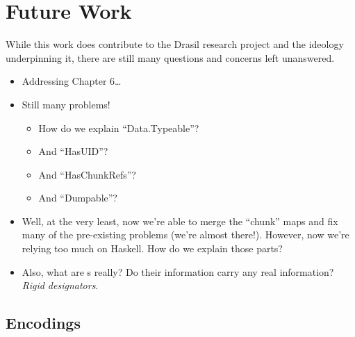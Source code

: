 \chapter{Future Work}
\label{chap:futureWork}


While this work does contribute to the Drasil research project and the ideology
underpinning it, there are still many questions and concerns left unanswered.

\begin{itemize}

      \item Addressing Chapter 6\ldots{}

      \item Still many problems!
            \begin{itemize}

                  \item How do we explain ``Data.Typeable''?

                  \item And ``HasUID''?

                  \item And ``HasChunkRefs''?

                  \item And ``Dumpable''?

            \end{itemize}

      \item Well, at the very least, now we're able to merge the ``chunk'' maps
            and fix many of the pre-existing problems (we're almost there!).
            However, now we're relying too much on Haskell. How do we explain
            those parts?

      \item Also, what are \UID{}s really? Do their information carry any real
            information? \textit{Rigid designators}.

\end{itemize}

\section{Encodings}

